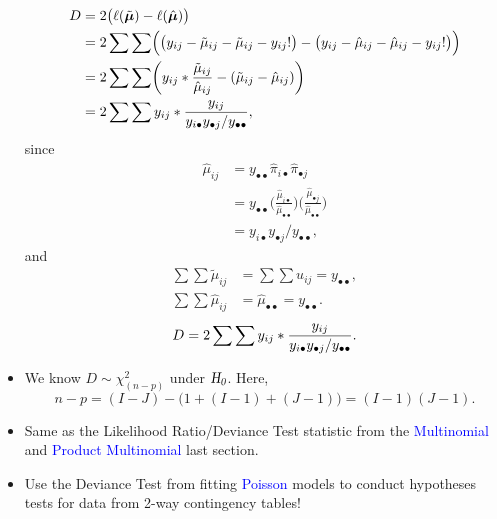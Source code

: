 \documentclass{article}\usepackage[]{graphicx}\usepackage[svgnames]{xcolor}
\let\log\relax%
\newcommand{\HN}{\textsl{H}_{\textsl{0}}}%
\providecommand{\Vector}[1]{\bm{#1}}%
\begin{document}
\begin{itemize}
          \begin{align*}
              D
               & =2\bigl(\ell(\tilde{\Vector{\mu}})-\ell(\hat{\Vector{\mu}})\bigr)                                                                                                   \\
               & =2\sum\sum\Bigl(\bigl(y_{ij}-\log{\tilde{\mu}_{ij}}-\tilde{\mu}_{ij}-\log{y_{ij}!}\bigr)-\bigl(y_{ij}-\log{\hat{\mu}_{ij}}-\hat{\mu}_{ij}-\log{y_{ij}!}\bigr)\Bigr) \\
               & =2\sum\sum\biggl(y_{ij}\log*{\frac{\tilde{\mu}_{ij}}{\hat{\mu}_{ij}}}-(\tilde{\mu}_{ij}-\hat{\mu}_{ij})\biggr)                                                      \\
               & =2\sum\sum y_{ij}\log*{\frac{y_{ij}}{y_{i\bullet}y_{\bullet j}/y_{\bullet\bullet}}},
          \end{align*}
          since
          \begin{align*}
              \hat{\mu}_{ij}
               & =y_{\bullet\bullet}\hat{\pi}_{i\bullet}\hat{\pi}_{\bullet j}                                                                                                   \\
               & =y_{\bullet\bullet}\biggl(\frac{\hat{\mu}_{i\bullet}}{\hat{\mu}_{\bullet\bullet}}\biggr)\biggl(\frac{\hat{\mu}_{\bullet j}}{\hat{\mu}_{\bullet\bullet}}\biggr) \\
               & =y_{i\bullet}y_{\bullet j}/y_{\bullet\bullet},
          \end{align*}
          and
          \begin{align*}
              \sum\sum\tilde{\mu}_{ij} & =\sum\sum u_{ij}=y_{\bullet\bullet},            \\
              \sum\sum\hat{\mu}_{ij}   & =\hat{\mu}_{\bullet\bullet}=y_{\bullet\bullet}.
          \end{align*}
          \[ D=2\sum\sum y_{ij}\log*{\frac{y_{ij}}{y_{i\bullet}y_{\bullet j}/y_{\bullet\bullet}}}. \]
    \item We know $ D \sim \chi^2_{(n-p)} $ under $ \HN $. Here,
          \[ n-p=(I-J)-\bigl(1+(I-1)+(J-1)\bigr)=(I-1)(J-1). \]
    \item Same as the Likelihood Ratio/Deviance Test statistic from the \textcolor{Blue}{Multinomial} and
          \textcolor{Blue}{Product Multinomial} last section.
    \item Use the Deviance Test from fitting \textcolor{Blue}{Poisson} models to conduct hypotheses tests
          for data from 2-way contingency tables!
\end{itemize}
\end{document}
